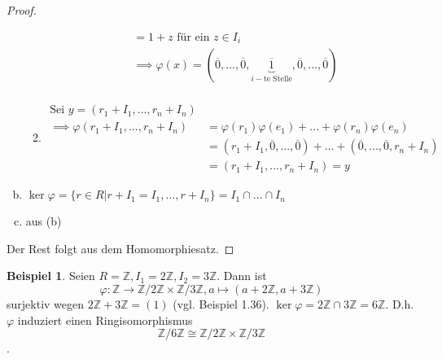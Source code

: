 \documentclass[a4paper, titlepage]{article}
\theoremstyle{definition}
\newtheorem{bsp}[satz]{Beispiel}
\newcommand{\Z}{\mathbb{Z}}
\begin{document}
\begin{proof}
\begin{enumerate}[(a)]
\begin{enumerate}
\begin{align*}
                    &= 1+z \text{ für ein } z \in I_i\\
                    &\implies \varphi(x)=(\overline{0},...,\overline{0},\underbrace{\overline{1}}_{i-\text{te Stelle}},\overline{0},...,\overline{0})\\
                \end{align*}
                \item \begin{align*}
                    \text{Sei } y=(r_1+I_1,...,r_n+I_n)\\
                    \implies \varphi(r_1+I_1,...,r_n+I_n)&=\varphi(r_1)\varphi(e_1)+...+\varphi(r_n)\varphi(e_n)\\
                    &=(r_1+I_1,\overline{0},...,\overline{0})+...+(\overline{0},...,\overline{0},r_n+I_n)\\
                    &=(r_1+I_1,...,r_n+I_n)=y
                \end{align*}
            \end{enumerate}
            \item $\ker \varphi = \{r\in R|r+I_1=I_1,...,r+I_n\}=I_1\cap ...\cap I_n$
            \item aus (b)
        \end{enumerate}
        Der Rest folgt aus dem Homomorphiesatz.
    \end{proof}
\begin{bsp}
    Seien $R= \Z, I_1=2\Z,I_2=3\Z$. Dann ist 
    $$\varphi:\Z\longrightarrow \Z/2\Z \times \Z/3\Z, a \mapsto (a+2\Z, a+3\Z)$$
    surjektiv wegen $2\Z+3\Z=(1)$ (vgl. Beispiel 1.36). $\ker \varphi=2\Z\cap 3\Z = 6\Z$. D.h. $\varphi$ induziert einen Ringisomorphismus 
    $$\Z/6\Z\cong \Z/2\Z\times \Z/3\Z$$.
\end{bsp}
\end{document}
